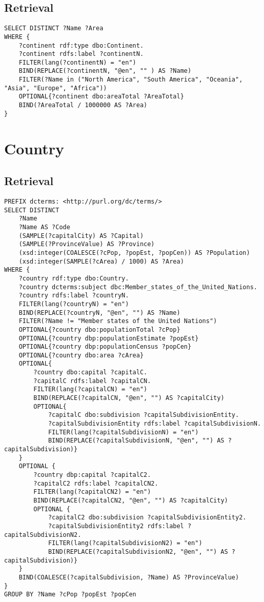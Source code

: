 \documentclass[11pt]{article}
\begin{document}
\subsection{Retrieval}

{\footnotesize\begin{verbatim}
SELECT DISTINCT ?Name ?Area
WHERE {
    ?continent rdf:type dbo:Continent.
    ?continent rdfs:label ?continentN.
    FILTER(lang(?continentN) = "en")
    BIND(REPLACE(?continentN, "@en", "" ) AS ?Name)
    FILTER(?Name in ("North America", "South America", "Oceania", "Asia", "Europe", "Africa"))
    OPTIONAL{?continent dbo:areaTotal ?AreaTotal}
    BIND(?AreaTotal / 1000000 AS ?Area)
}
\end{verbatim}}


\section{Country}

\subsection{Retrieval}
{\footnotesize\begin{verbatim}
PREFIX dcterms: <http://purl.org/dc/terms/>
SELECT DISTINCT 
    ?Name
    ?Name AS ?Code
    (SAMPLE(?capitalCity) AS ?Capital)
    (SAMPLE(?ProvinceValue) AS ?Province)
    (xsd:integer(COALESCE(?cPop, ?popEst, ?popCen)) AS ?Population)
    (xsd:integer(SAMPLE(?cArea) / 1000) AS ?Area)
WHERE {
    ?country rdf:type dbo:Country. 
    ?country dcterms:subject dbc:Member_states_of_the_United_Nations. 
    ?country rdfs:label ?countryN. 
    FILTER(lang(?countryN) = "en")
    BIND(REPLACE(?countryN, "@en", "") AS ?Name)
    FILTER(?Name != "Member states of the United Nations")
    OPTIONAL{?country dbo:populationTotal ?cPop}
    OPTIONAL{?country dbp:populationEstimate ?popEst}
    OPTIONAL{?country dbp:populationCensus ?popCen}
    OPTIONAL{?country dbo:area ?cArea}
    OPTIONAL{ 
        ?country dbo:capital ?capitalC.
        ?capitalC rdfs:label ?capitalCN. 
        FILTER(lang(?capitalCN) = "en")
        BIND(REPLACE(?capitalCN, "@en", "") AS ?capitalCity)
        OPTIONAL{ 
            ?capitalC dbo:subdivision ?capitalSubdivisionEntity.
            ?capitalSubdivisionEntity rdfs:label ?capitalSubdivisionN.
            FILTER(lang(?capitalSubdivisionN) = "en")
            BIND(REPLACE(?capitalSubdivisionN, "@en", "") AS ?capitalSubdivision)}
    }
    OPTIONAL { 
        ?country dbp:capital ?capitalC2.
        ?capitalC2 rdfs:label ?capitalCN2. 
        FILTER(lang(?capitalCN2) = "en")
        BIND(REPLACE(?capitalCN2, "@en", "") AS ?capitalCity)
        OPTIONAL { 
            ?capitalC2 dbo:subdivision ?capitalSubdivisionEntity2.
            ?capitalSubdivisionEntity2 rdfs:label ?capitalSubdivisionN2.
            FILTER(lang(?capitalSubdivisionN2) = "en")
            BIND(REPLACE(?capitalSubdivisionN2, "@en", "") AS ?capitalSubdivision)}
    }
    BIND(COALESCE(?capitalSubdivision, ?Name) AS ?ProvinceValue)
}
GROUP BY ?Name ?cPop ?popEst ?popCen
    
\end{verbatim}}
\end{document}
